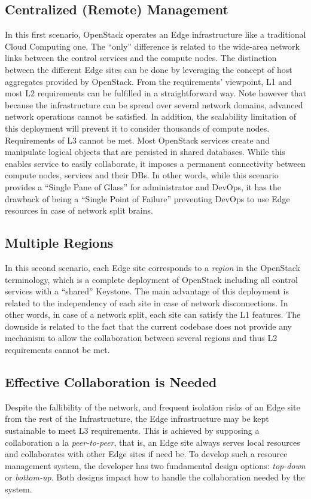 \subsection{Centralized (Remote) Management}
\label{subsec:centralized_os}
In this first scenario, OpenStack operates an Edge infrastructure
like a traditional Cloud Computing one. The ``only'' difference is
related to the wide-area network links between the control services
and the compute nodes. The distinction between the different Edge
sites can be done by leveraging the concept of host aggregates
provided by OpenStack.
%
From the requirements' viewpoint, L1 and most L2 requirements can be
fulfilled in a straightforward way. Note however that because the
infrastructure can be spread over several network domains, advanced
network operations cannot be satisfied. In addition, the scalability
limitation of this deployment will prevent it to consider thousands of
compute nodes.
%
Requirements of L3 cannot be met. Most OpenStack services create and
manipulate logical objects that are persisted in shared databases.
While this enables service to easily collaborate, it imposes a
permanent connectivity between compute nodes, services and their DBs.
In other words, while this scenario provides a ``Single Pane of
Glass'' for administrator and DevOps, it has the drawback of being a
``Single Point of Failure'' preventing DevOps to use Edge resources in
case of network split brains.



\subsection{Multiple Regions}
In this second scenario, each Edge site corresponds to a \emph{region}
in the OpenStack terminology, which is a complete deployment of
OpenStack including all control services with a ``shared'' Keystone.
The main advantage of this
deployment is related to the independency of each site in case of
network disconnections. In other words, in case of a network split,
each site can satisfy the L1 features. The downside is related to the
fact that the current codebase does not provide any mechanism to allow
the collaboration between several regions and thus L2 requirements
cannot be met.


\subsection{Effective Collaboration is Needed}
Despite the fallibility of the network, and frequent isolation risks
of an Edge site from the rest of the Infrastructure, the Edge
infrastructure may be kept sustainable to meet L3 requirements. This
is achieved by supposing a collaboration a la \emph{peer-to-peer},
that is, an Edge site always serves local resources and collaborates
with other Edge sites if need be. To develop such a resource
management system, the developer has two fundamental design options:
\emph{top-down} or \emph{bottom-up}. Both designs impact how to handle
the collaboration needed by the system.

